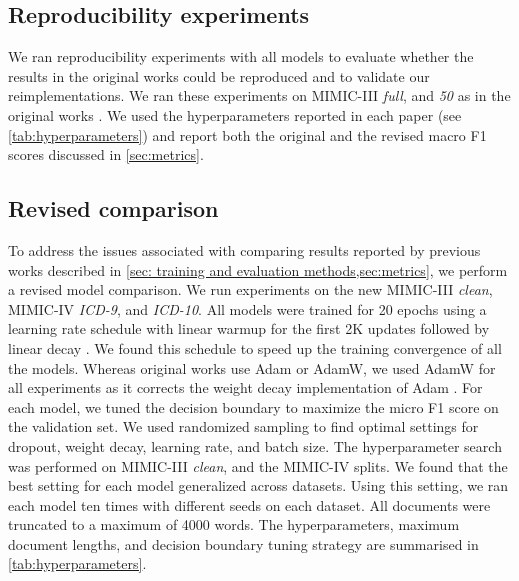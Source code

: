 \documentclass[anonymous=false, sigconf=true, review=false, natbib=true]{acmart}
\begin{document}
\subsection{Reproducibility experiments}

We ran reproducibility experiments with all models to evaluate whether the results in the original works could be reproduced and to validate our reimplementations. We ran these experiments on MIMIC-III \textit{full}, and \textit{50} as in the original works \cite{mullenbachExplainablePredictionMedical2018,liICDCodingClinical2020,vuLabelAttentionModel2020,huangPLMICDAutomaticICD2022}. We used the hyperparameters reported in each paper (see \cref{tab:hyperparameters}) and report both the original and the revised macro F1 scores discussed in \cref{sec:metrics}.



\subsection{Revised comparison}



To address the issues associated with comparing results reported by previous works described in \cref{sec: training and evaluation methods,sec:metrics}, we perform a revised model comparison. We run experiments on the new MIMIC-III \textit{clean}, MIMIC-IV \textit{ICD-9}, and \textit{ICD-10}.
All models were trained for 20 epochs using a learning rate schedule with linear warmup for the first 2K updates followed by linear decay \cite{huangPLMICDAutomaticICD2022}. We found this schedule to speed up the training convergence of all the models.
Whereas original works use Adam or AdamW, we used AdamW for all experiments as it corrects the weight decay implementation of Adam \cite{kingmaAdamMethodStochastic2017, loshchilovDecoupledWeightDecay2022}. For each model, we tuned the decision boundary to maximize the micro F1 score on the validation set. We used randomized sampling to find optimal settings for dropout, weight decay, learning rate, and batch size. The hyperparameter search was performed on MIMIC-III \textit{clean}, and the MIMIC-IV splits. We found that the best setting for each model generalized across datasets. Using this setting, we ran each model ten times with different seeds on each dataset. All documents were truncated to a maximum of 4000 words. The hyperparameters, maximum document lengths, and decision boundary tuning strategy are summarised in \cref{tab:hyperparameters}. 
\end{document}
